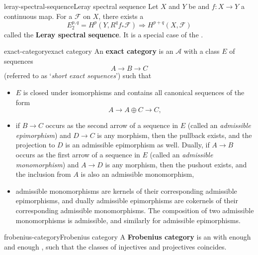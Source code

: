 \begin{topic}{leray-spectral-sequence}{Leray spectral sequence}
    Let $X$ and $Y$ be  and $f : X \to Y$ a continuous map. For a  $\mathcal{F}$ on $X$, there exists a 
    \[ E_2^{p, q} = H^p(Y, R^q f_* \mathcal{F}) \Rightarrow H^{p + q}(X, \mathcal{F}) \]
    called the \textbf{Leray spectral sequence}. It is a special case of the .
\end{topic}

\begin{topic}{exact-category}{exact category}
    An \textbf{exact category} is an  $\mathcal{A}$ with a class $E$ of sequences
    \[ A \to B \to C \]
    (referred to as `\textit{short exact sequences}') such that
    \begin{itemize}
        \item $E$ is closed under isomorphisms and contains all canonical sequences of the form
        \[ A \to A \oplus C \to C , \]
        \item if $B \to C$ occurs as the second arrow of a sequence in $E$ (called an \textit{admissible epimorphism}) and $D \to C$ is any morphism, then the pullback exists, and the projection to $D$ is an admissible epimorphism as well. Dually, if $A \to B$ occurs as the first arrow of a sequence in $E$ (called an \textit{admissible monomorphism}) and $A \to D$ is any morphism, then the pushout exists, and the inclusion from $A$ is also an admissible monomorphism,
        \item admissible monomorphisms are kernels of their corresponding admissible epimorphisms, and dually admissible epimorphisms are cokernels of their corresponding admissible monomorphisms. The composition of two admissible monomorphisms is admissible, and similarly for admissible epimorphisms.
    \end{itemize}
\end{topic}

\begin{topic}{frobenius-category}{Frobenius category}
    A \textbf{Frobenius category} is an  with enough  and enough , such that the classes of injectives and projectives coincides.
\end{topic}

